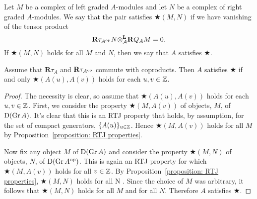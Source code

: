 \begin{definition} \label{definition: tensor vanishing}
  Let \(M\) be a complex of left graded \(A\)-modules and let \(N\) be a complex of right graded \(A\)-modules. We say that the pair satisfies \(\bigstar(M,N)\) if we have vanishing of the tensor product
  \begin{displaymath}
    \mathbf{R} \tau_{A^{\operatorname{op}}} N {\otimes}^{\mathbf{L}}_{\mathcal A} \mathbf{R} Q_A M = 0.
  \end{displaymath}
  If \(\bigstar(M,N)\) holds for all \(M\) and \(N\), then we say that \(A\) satisfies \(\bigstar\). 
\end{definition}

\begin{proposition} \label{proposition: big star condition}
  Assume that \(\mathbf{R}\tau_A\) and \(\mathbf{R}\tau_{A^{\operatorname{op}}}\) commute with coproducts. Then \(A\) satisfies \(\bigstar\) if and only \(\bigstar( A(u), A(v) )\) holds for each \(u,v \in \mathbb{Z}\).
\end{proposition}

\begin{proof}
  The necessity is clear, so assume that \(\bigstar(A(u), A(v))\) holds for each \(u,v \in \mathbb{Z}\).
  First, we consider the property \(\bigstar(M, A(v))\) of objects, \(M\), of \(\mathrm{D}(\operatorname{Gr}A)\).
  It's clear that this is an RTJ property that holds, by assumption, for the set of compact generators, \(\{A(u)\}_{u \in \mathbb{Z}}\).
  Hence \(\bigstar(M,A(v))\) holds for all \(M\) by Proposition~\ref{proposition: RTJ properties}.

  Now fix any object \(M\) of \(\mathrm{D}(\operatorname{Gr}A)\) and consider the property \(\bigstar(M, N)\) of objects, \(N\), of \(\mathrm{D}(\operatorname{Gr}A^{\operatorname{op}})\).
  This is again an RTJ property for which \(\bigstar(M,A(v))\) holds for all \(v \in \mathbb{Z}\).
  By Proposition~\ref{proposition: RTJ properties}, \(\bigstar(M,N)\) holds for all N .
  Since the choice of \(M\) was arbitrary, it follows that \(\bigstar(M,N)\) holds for all \(M\) and for all \(N\).
  Therefore \(A\) satisfies \(\bigstar\).
\end{proof}

